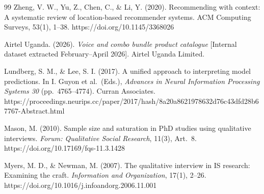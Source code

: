 \begin{thebibliography}{99}
Zheng, V. W., Yu, Z., Chen, C., \& Li, Y. (2020). Recommending with context: A systematic review of location-based recommender systems. ACM Computing Surveys, 53(1), 1--38. https://doi.org/10.1145/3368026

Airtel Uganda. (2026). \textit{Voice and combo bundle product catalogue}
[Internal dataset extracted February--April 2026]. Airtel Uganda Limited.

Lundberg, S. M., \& Lee, S. I. (2017). A unified approach to interpreting model
predictions. In I. Guyon et al.\ (Eds.), \textit{Advances in Neural Information
Processing Systems 30} (pp.\ 4765--4774). Curran Associates.
https://proceedings.neurips.cc/paper/2017/hash/8a20a8621978632d76c43dfd28b67767-Abstract.html

Mason, M. (2010). Sample size and saturation in PhD studies using qualitative
interviews. \textit{Forum: Qualitative Social Research}, 11(3), Art.\ 8.
https://doi.org/10.17169/fqs-11.3.1428

Myers, M. D., \& Newman, M. (2007). The qualitative interview in IS research:
Examining the craft. \textit{Information and Organization}, 17(1), 2--26.
https://doi.org/10.1016/j.infoandorg.2006.11.001


\end{thebibliography}
